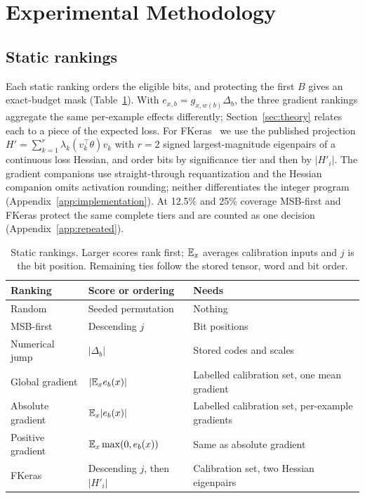 \section{Experimental Methodology}\label{sec:experiments}
\subsection{Static rankings}\label{sec:susceptibility}\label{sec:estimators}
Each static ranking orders the eligible bits, and protecting the first $B$ gives an exact-budget mask (Table~\ref{tab:methods}). With $e_{x,b}=g_{x,w(b)}\Delta_b$, the three gradient rankings aggregate the same per-example effects differently; Section~\ref{sec:theory} relates each to a piece of the expected loss. For FKeras~\cite{weng2024fkeras} we use the published projection $H'=\sum_{k=1}^{r}\lambda_k(v_k^\top\theta)v_k$ with $r=2$ signed largest-magnitude eigenpairs of a continuous loss Hessian, and order bits by significance tier and then by $|H'_i|$. The gradient companions use straight-through requantization and the Hessian companion omits activation rounding; neither differentiates the integer program (Appendix~\ref{app:implementation}). At 12.5\% and 25\% coverage MSB-first and FKeras protect the same complete tiers and are counted as one decision (Appendix~\ref{app:repeated}).

\begin{table}[t]
\caption{Static rankings. Larger scores rank first; $\mathbb{E}_x$ averages calibration inputs and $j$ is the bit position. Remaining ties follow the stored tensor, word and bit order.}\label{tab:methods}
\centering\small
\begin{tabularx}{\linewidth}{l l X}\toprule
Ranking & Score or ordering & Needs\\\midrule
Random & Seeded permutation & Nothing\\
MSB-first & Descending $j$ & Bit positions\\
Numerical jump & $|\Delta_b|$ & Stored codes and scales\\
Global gradient & $|\mathbb{E}_x e_b(x)|$ & Labelled calibration set, one mean gradient\\
Absolute gradient & $\mathbb{E}_x|e_b(x)|$ & Labelled calibration set, per-example gradients\\
Positive gradient & $\mathbb{E}_x\max(0,e_b(x))$ & Same as absolute gradient\\
FKeras & Descending $j$, then $|H'_i|$ & Calibration set, two Hessian eigenpairs\\\bottomrule
\end{tabularx}
\end{table}

